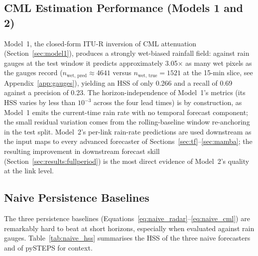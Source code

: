 \documentclass[12pt, a4paper]{article}
\begin{document}
\subsection{CML Estimation Performance (Models 1 and 2)}

Model~1, the closed-form ITU-R inversion of CML attenuation
(Section~\ref{sec:model1}), produces a strongly wet-biased rainfall
field: against rain gauges at the test window it predicts approximately
3.05$\times$ as many wet pixels as the gauges record
($n_{\text{wet, pred}}\!\approx\!4641$ versus $n_{\text{wet, true}}\!=\!1521$
at the 15-min slice, see Appendix~\ref{app:gauges}), yielding an HSS
of only 0.266 and a recall of 0.69 against a precision of 0.23. The
horizon-independence of Model~1's metrics (its HSS varies by less than
$10^{-3}$ across the four lead times) is by construction, as Model~1
emits the current-time rain rate with no temporal forecast component;
the small residual variation comes from the rolling-baseline window
re-anchoring in the test split. Model~2's per-link rain-rate
predictions are used downstream as the input maps to every advanced
forecaster of Sections~\ref{sec:tf}--\ref{sec:mamba}; the resulting
improvement in downstream forecast skill (Section~\ref{sec:results:fullperiod})
is the most direct evidence of Model~2's quality at the link level.

\subsection{Naive Persistence Baselines}\label{sec:results:naive}

The three persistence baselines (Equations~\ref{eq:naive_radar}--\ref{eq:naive_cml})
are remarkably hard to beat at short horizons, especially when
evaluated against rain gauges. Table~\ref{tab:naive_hss} summarises the
HSS of the three naive forecasters and of pySTEPS for context.
\end{document}
